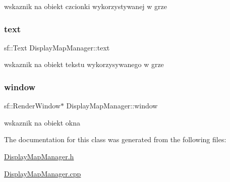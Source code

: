 wskaznik na obiekt czcionki wykorzystywanej w grze \mbox{\label{class_display_map_manager_ad9a89d13fbf1ac95fbb058b565bb4d2f}} 
\subsubsection{\texorpdfstring{text}{text}}
{\footnotesize\ttfamily sf\+::\+Text Display\+Map\+Manager\+::text}

wskaznik na obiekt tekstu wykorzysywanego w grze \mbox{\label{class_display_map_manager_a880f01a1287f35cc4852c2e5d58ecd24}} 
\subsubsection{\texorpdfstring{window}{window}}
{\footnotesize\ttfamily sf\+::\+Render\+Window$\ast$ Display\+Map\+Manager\+::window}

wskaznik na obiekt okna 

The documentation for this class was generated from the following files\+:\begin{DoxyCompactItemize}
\item 
\hyperlink{_display_map_manager_8h}{Display\+Map\+Manager.\+h}\item 
\hyperlink{_display_map_manager_8cpp}{Display\+Map\+Manager.\+cpp}\end{DoxyCompactItemize}
